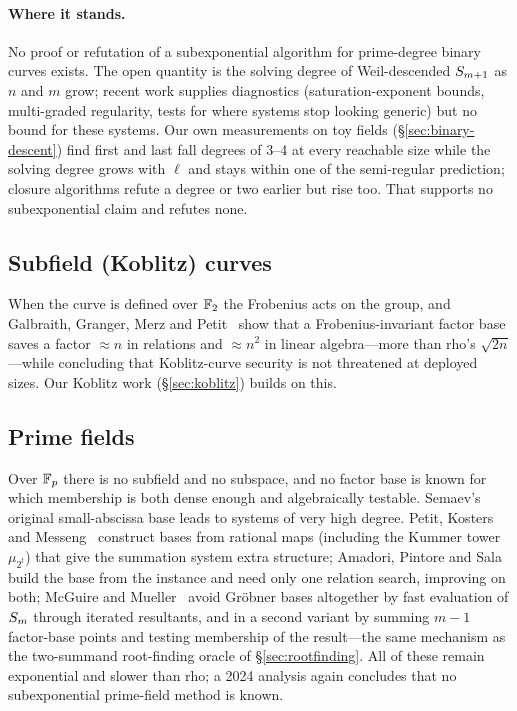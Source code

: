 \paragraph{Where it stands.} No proof or refutation of a subexponential
algorithm for prime-degree binary curves exists. The open quantity is the
solving degree of Weil-descended $S_{m+1}$ as $n$ and $m$ grow; recent
work supplies diagnostics (saturation-exponent bounds, multi-graded
regularity, tests for where systems stop looking generic) but no bound for
these systems. Our own measurements on toy fields (\S\ref{sec:binary-descent}) find
first and last fall degrees of 3--4 at every reachable size while the
solving degree grows with $\ell$ and stays within one of the semi-regular
prediction; closure algorithms refute a degree or two earlier but rise too.
That supports no subexponential claim and refutes none.

\subsection{Subfield (Koblitz) curves}

When the curve is defined over $\mathbb{F}_2$ the Frobenius acts on the group,
and Galbraith, Granger, Merz and Petit~\cite{ggmp2020} show that a
Frobenius-invariant factor base saves a factor $\approx n$ in relations and
$\approx n^2$ in linear algebra---more than rho's $\sqrt{2n}$---while
concluding that Koblitz-curve security is not threatened at deployed sizes.
Our Koblitz work (\S\ref{sec:koblitz}) builds on this.

\subsection{Prime fields}

Over $\mathbb{F}_p$ there is no subfield and no subspace, and no factor base is
known for which membership is both dense enough and algebraically testable.
Semaev's original small-abscissa base leads to systems of very high degree.
Petit, Kosters and Messeng~\cite{pkm2016} construct bases from rational maps
(including the Kummer tower $\mu_{2^t}$) that give the summation system
extra structure; Amadori, Pintore and Sala~\cite{aps2018} build the base
from the instance and need only one relation search, improving on both;
McGuire and Mueller~\cite{mcguire2017} avoid Gr\"obner bases altogether by
fast evaluation of $S_{m}$ through iterated resultants, and in a second
variant by summing $m-1$ factor-base points and testing membership of the
result---the same mechanism as the two-summand root-finding oracle of
\S\ref{sec:rootfinding}. All of these remain exponential and slower than
rho; a 2024 analysis again concludes that no subexponential prime-field
method is known.

